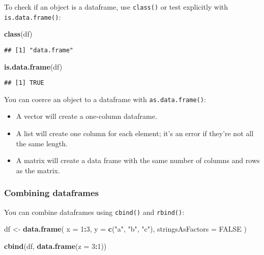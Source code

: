 \documentclass[
]{book}
\newenvironment{Shaded}{\begin{snugshade}}{\end{snugshade}}
\newcommand{\DataTypeTok}[1]{\textcolor[rgb]{0.13,0.29,0.53}{#1}}
\newcommand{\DecValTok}[1]{\textcolor[rgb]{0.00,0.00,0.81}{#1}}
\newcommand{\KeywordTok}[1]{\textcolor[rgb]{0.13,0.29,0.53}{\textbf{#1}}}
\newcommand{\NormalTok}[1]{#1}
\newcommand{\OperatorTok}[1]{\textcolor[rgb]{0.81,0.36,0.00}{\textbf{#1}}}
\newcommand{\OtherTok}[1]{\textcolor[rgb]{0.56,0.35,0.01}{#1}}
\newcommand{\StringTok}[1]{\textcolor[rgb]{0.31,0.60,0.02}{#1}}
\begin{document}
To check if an object is a dataframe, use \texttt{class()} or test explicitly with \texttt{is.data.frame()}:

\begin{Shaded}
\begin{Highlighting}[]
\KeywordTok{class}\NormalTok{(df)}
\end{Highlighting}
\end{Shaded}

\begin{verbatim}
## [1] "data.frame"
\end{verbatim}

\begin{Shaded}
\begin{Highlighting}[]
\KeywordTok{is.data.frame}\NormalTok{(df)}
\end{Highlighting}
\end{Shaded}

\begin{verbatim}
## [1] TRUE
\end{verbatim}

You can coerce an object to a dataframe with \texttt{as.data.frame()}:

\begin{itemize}
\item
  A vector will create a one-column dataframe.
\item
  A list will create one column for each element; it's an error if they're
  not all the same length.
\item
  A matrix will create a data frame with the same number of columns and rows as the matrix.
\end{itemize}

\hypertarget{combining-dataframes}{%
\subsubsection{Combining dataframes}\label{combining-dataframes}}

You can combine dataframes using \texttt{cbind()} and \texttt{rbind()}:

\begin{Shaded}
\begin{Highlighting}[]
\NormalTok{df \textless{}{-}}\StringTok{ }\KeywordTok{data.frame}\NormalTok{(}
  \DataTypeTok{x =} \DecValTok{1}\OperatorTok{:}\DecValTok{3}\NormalTok{,}
  \DataTypeTok{y =} \KeywordTok{c}\NormalTok{(}\StringTok{"a"}\NormalTok{, }\StringTok{"b"}\NormalTok{, }\StringTok{"c"}\NormalTok{),}
  \DataTypeTok{stringsAsFactors =} \OtherTok{FALSE}
\NormalTok{)}

\KeywordTok{cbind}\NormalTok{(df, }\KeywordTok{data.frame}\NormalTok{(}\DataTypeTok{z =} \DecValTok{3}\OperatorTok{:}\DecValTok{1}\NormalTok{))}
\end{Highlighting}
\end{Shaded}
\end{document}
